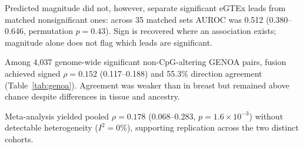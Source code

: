 \documentclass[10pt,letterpaper,twocolumn]{article}
\begin{document}
Predicted magnitude did not, however, separate significant eGTEx leads from
matched nonsignificant ones: across 35 matched sets AUROC was 0.512
(0.380--0.646, permutation $p=0.43$). Sign is recovered where an association
exists; magnitude alone does not flag which leads are significant.

Among 4{,}037 genome-wide significant non-CpG-altering GENOA pairs, fusion
achieved signed $\rho=0.152$ (0.117--0.188) and 55.3\% direction agreement
(Table~\ref{tab:genoa}). Agreement was weaker than in breast but remained above
chance despite differences in tissue and ancestry.

\color{black}
\begin{table}[!tbp]
\centering
\caption{\textbf{Independent variant evaluation on GENOA.} Held-out stratum,
non-CpG-altering pairs, three-seed ensemble. Brackets are 95\% intervals from a
block bootstrap over 1-Mb blocks. Signed $\rho$ and direction agreement are
computed on genome-wide significant pairs ($p<5\times10^{-8}$, $n=4{,}037$);
AUROC uses all 42{,}866 pairs.}
\label{tab:genoa}
\small
{}
\end{table}
\color{addedred}

Meta-analysis yielded pooled $\rho=0.178$ (0.068--0.283,
$p=1.6\times10^{-3}$) without detectable heterogeneity ($I^2=0\%$), supporting
replication across the two distinct cohorts.
\end{document}
